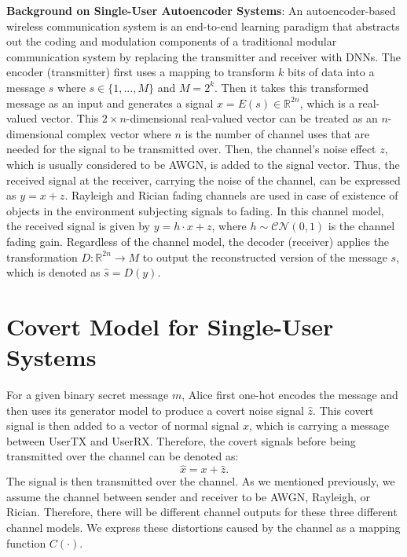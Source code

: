 \textbf{Background on Single-User Autoencoder Systems}: An autoencoder-based wireless communication system is an end-to-end learning paradigm that abstracts out the coding and modulation components of a  traditional modular communication system by replacing the transmitter and receiver with DNNs. The encoder (transmitter) first uses a mapping to transform \(k\) bits of data into a message \(s\) where \(s \in \{1,...,M\}\) and \(M = 2^k\). Then it takes this transformed message as an input and generates a signal \(x = E(s) \in \mathbb{R}^{2n}\), which is a real-valued vector. This \(2 \times n\)-dimensional real-valued vector can be treated as an \(n\)-dimensional complex vector where \(n\) is the number of channel uses that are needed for the signal to be transmitted over. Then, the channel's noise effect \(z\), which is usually considered to be AWGN, is added to the signal vector. Thus, the received signal at the receiver, carrying the noise of the channel, can be expressed as \(y = x + z\). Rayleigh and Rician fading channels are used in case of existence of objects in the environment subjecting signals to fading. In this channel model, the received signal is given by \(y = h \cdot x + z\), where \(h \sim \mathcal{CN}(0, 1)\) is the channel fading gain. Regardless of the channel model, the decoder (receiver) applies the transformation \(D: \mathbb{R}^{2n} \rightarrow M \) to output the reconstructed version of the message \(s\), which is denoted as \(\hat{s} = D(y)\).

\section{Covert Model for Single-User Systems}
For a given binary secret message \(m\), Alice first one-hot encodes the message and then uses its generator model to produce a covert noise signal \(\hat{z}\). This covert signal is then added to a vector of normal signal \(x\), which is carrying a message between UserTX and UserRX. Therefore, the covert signals before being transmitted over the channel can be denoted as:
\begin{equation}
	\hat{x} = x + \hat{z}.
\end{equation}
The signal is then transmitted over the channel. As we mentioned previously, we assume the channel between sender and receiver to be AWGN, Rayleigh, or Rician. Therefore, there will be different channel outputs for these three different channel models. We express these distortions caused by the channel as a mapping function \(C(\cdot)\).\\


